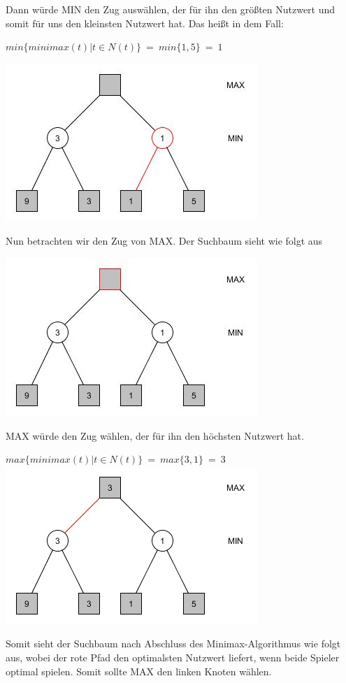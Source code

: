 Dann würde MIN den Zug auswählen, der für ihn den größten Nutzwert und somit für uns den kleinsten Nutzwert hat. Das heißt in dem Fall:
\begin{center}
	$min\{minimax(t) | t \in N(t)\} ~=~ min\{1,5\} ~=~ 1$

	\includegraphics[width = 7 cm]{chapters/minimax/jpg/Graph-Minmax2-4.jpg}
\end{center}

Nun betrachten wir den Zug von MAX. Der Suchbaum sieht wie folgt aus

\begin{center}
	\includegraphics[width = 7 cm]{chapters/minimax/jpg/Graph-Minmax2.jpg}
\end{center}

MAX würde den Zug wählen, der für ihn den höchsten Nutzwert hat.\\

\begin{center}
	$max\{minimax(t) | t \in N(t)\} ~=~ max\{3,1\} ~=~ 3$
	\includegraphics[width = 7 cm]{chapters/minimax/jpg/Graph-Minmax3.jpg}
\end{center}

Somit sieht der Suchbaum nach Abschluss des Minimax-Algorithmus wie folgt aus, wobei der rote Pfad den optimalsten Nutzwert liefert, wenn beide Spieler optimal spielen. Somit sollte MAX den linken Knoten wählen.

